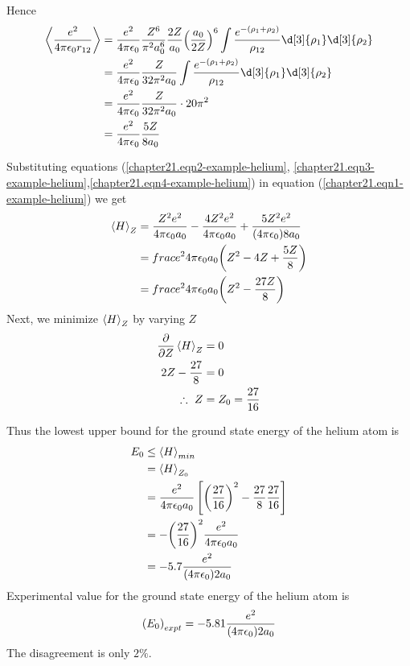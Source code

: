 	Hence
	\begin{align*}
		\expval{\frac{e^2}{4\pi \epsilon_0 r_{1 2}}} &= \frac{e^2}{4\pi \epsilon_0}  \frac{Z^6}{\pi^2 a_0^6} \frac{2 Z}{a_0} \qty(\frac{a_0}{2 Z})^6  \int \frac{e^{-\qty(\rho_1 + \rho_2)}}{\rho_{12}} \d[3]{\rho_1} \d[3]{\rho_2} \\
		&= \frac{e^2}{4\pi \epsilon_0} \frac{Z}{32 \pi^2 a_0} \int \frac{e^{-\qty(\rho_1 + \rho_2)}}{\rho_{12}} \d[3]{\rho_1} \d[3]{\rho_2} \\
		&= \frac{e^2}{4\pi \epsilon_0} \frac{Z}{32 \pi^2 a_0} \cdot 20 \pi^2 \\
		&= \frac{e^2}{4\pi \epsilon_0} \frac{5 Z}{8 a_0} 
		\label{chapter21.eqn4-example-helium}
	\end{align*}
	
	Substituting equations (\ref{chapter21.eqn2-example-helium}, \ref{chapter21.eqn3-example-helium},\ref{chapter21.eqn4-example-helium}) in equation (\ref{chapter21.eqn1-example-helium}) we get
	\begin{align*}
		\expval{H}_Z 
		&= \frac{Z^2 e^2}{4\pi \epsilon_0 a_0} - \frac{4 Z^2 e^2}{4\pi \epsilon_0 a_0} + \frac{ 5 Z^2 e^2}{\qty(4\pi \epsilon_0) 8 a_0}\\
		&= frac{e^2}{4\pi \epsilon_0 a_0} \qty(Z^2 - 4 Z + \frac{5 Z}{8}) \\
		&= frac{e^2}{4\pi \epsilon_0 a_0} \qty(Z^2 - \frac{27 Z}{8})
	\end{align*}
	Next, we minimize $\expval{H}_Z$ by varying $Z$
	\begin{align*}
		\pdv{}{Z} \expval{H}_Z & = 0\\
		2 Z - \frac{27}{8} &= 0\\
	\therefore \	Z &= Z_0 = \frac{27}{16}
	\end{align*}
	
	Thus the lowest upper bound for the ground state energy of the helium atom is
	\begin{align*}
		E_0 &\leq \expval{H}_{min} \\
		&= \expval{H}_{Z_0}\\
		&= \frac{e^2}{4\pi \epsilon_0 a_0} \left[
		\qty(\frac{27}{16})^2 - \frac{27}{8} \frac{27}{16} \right]\\
		&= - \qty(\frac{27}{16})^2 \frac{e^2}{4\pi \epsilon_0 a_0} \\
		&= -5.7 \frac{e^2}{\qty(4\pi \epsilon_0) 2 a_0}		
	\end{align*}
	Experimental value for the ground state energy of the helium atom is
	\begin{equation*}
		\qty(E_0)_{expt} = - 5.81 \frac{e^2}{\qty(4\pi \epsilon_0) 2 a_0}
	\end{equation*}
	The disagreement is only $2\%$.\\
	
